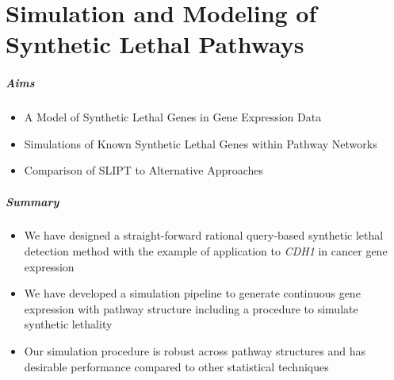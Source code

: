 \chapter{Simulation and Modeling of Synthetic Lethal Pathways}
\label{chap:simulation}


\paragraph{Aims}

  \begin{itemize}
   \item A Model of Synthetic Lethal Genes in Gene Expression Data
   
   \bigskip
   
   \item Simulations of Known Synthetic Lethal Genes within Pathway Networks
   
   \bigskip
   
   \item Comparison of SLIPT to Alternative Approaches
  \end{itemize}

\paragraph{Summary}

    \begin{itemize}
      \item We have designed a straight-forward rational query-based synthetic lethal detection method with the example of application to \textit{CDH1} in cancer gene expression
      
      \bigskip
      
      \item We have developed a simulation pipeline to generate continuous gene expression with pathway structure including a procedure to simulate synthetic lethality 
      
      \bigskip
      
      \item Our simulation procedure is robust across pathway structures and has desirable performance compared to other statistical techniques 
      \end{itemize}


